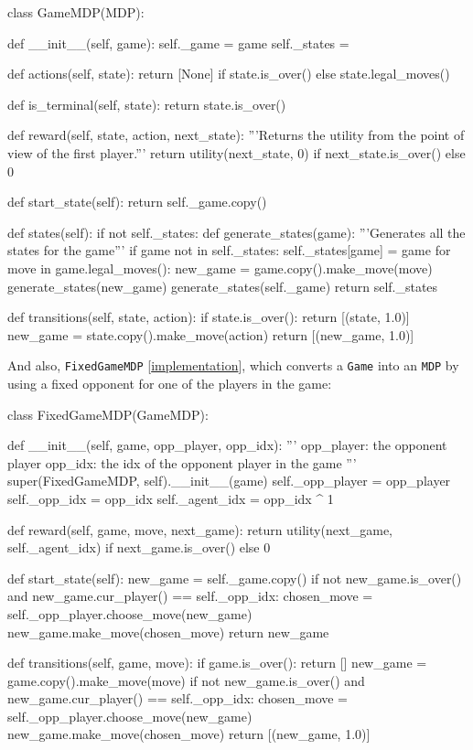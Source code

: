 \documentclass{article}
\newcommand{\GithubURL}[1]{[\href{https://github.com/davidrobles/mlnd-capstone-code/blob/master/#1}{implementation}]}
\begin{document}
\begin{python}
class GameMDP(MDP):

    def __init__(self, game):
        self._game = game
        self._states = {}

    def actions(self, state):
        return [None] if state.is_over() else state.legal_moves()

    def is_terminal(self, state):
        return state.is_over()

    def reward(self, state, action, next_state):
        '''Returns the utility from the point of view of the first player.'''
        return utility(next_state, 0) if next_state.is_over() else 0

    def start_state(self):
        return self._game.copy()

    def states(self):
        if not self._states:
            def generate_states(game):
                '''Generates all the states for the game'''
                if game not in self._states:
                    self._states[game] = game
                for move in game.legal_moves():
                    new_game = game.copy().make_move(move)
                    generate_states(new_game)
            generate_states(self._game)
        return self._states

    def transitions(self, state, action):
        if state.is_over():
            return [(state, 1.0)]
        new_game = state.copy().make_move(action)
        return [(new_game, 1.0)]
\end{python}

And also, \texttt{FixedGameMDP} \GithubURL{capstone/rl/mdp.py\#L108}, which converts a \texttt{Game}
into an \texttt{MDP} by using a fixed opponent for one of the players in the game:

\begin{python}
class FixedGameMDP(GameMDP):

    def __init__(self, game, opp_player, opp_idx):
        '''
        opp_player: the opponent player
        opp_idx: the idx of the opponent player in the game
        '''
        super(FixedGameMDP, self).__init__(game)
        self._opp_player = opp_player
        self._opp_idx = opp_idx
        self._agent_idx = opp_idx ^ 1

    def reward(self, game, move, next_game):
        return utility(next_game, self._agent_idx) if next_game.is_over() else 0

    def start_state(self):
        new_game = self._game.copy()
        if not new_game.is_over() and new_game.cur_player() == self._opp_idx:
            chosen_move = self._opp_player.choose_move(new_game)
            new_game.make_move(chosen_move)
        return new_game

    def transitions(self, game, move):
        if game.is_over():
            return []
        new_game = game.copy().make_move(move)
        if not new_game.is_over() and new_game.cur_player() == self._opp_idx:
            chosen_move = self._opp_player.choose_move(new_game)
            new_game.make_move(chosen_move)
        return [(new_game, 1.0)]
\end{python}
\end{document}

